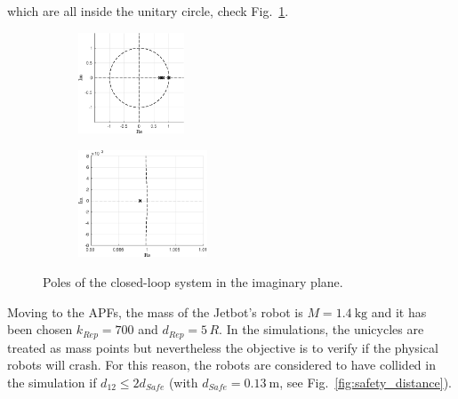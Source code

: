 \documentclass{ifacconf}
\begin{document}
which are all inside the unitary circle,
check Fig.~\ref{fig:poles-simulation}.
\begin{figure}
    \centering
    \hspace{-1.5cm}
    \begin{subfigure}[b]{0.3\columnwidth}
        \includegraphics[height=3cm]{images/simulations/poles_simulations.eps}
    \end{subfigure}
    \hspace{0.3cm}
    \begin{subfigure}[b]{0.3\columnwidth}
        \includegraphics[height=3.2cm]{images/simulations/poles_simulations_zoom.eps}
    \end{subfigure}
    \vspace{-0.3cm}
    \caption{Poles of the closed-loop system in the imaginary plane.}
    \label{fig:poles-simulation}
\end{figure}
Moving to the APFs, the mass of the Jetbot's robot is 
$M = \SI{1.4}{\kilo\gram}$ and it has been chosen $k_{Rep} = 700$
and $d_{Rep} = 5 \, R$.
In the simulations, the unicycles are treated as mass points but
nevertheless the objective is to verify if the physical robots will crash.
For this reason, the robots are considered to have collided in the simulation
if $d_{12} \leq 2 d_{Safe}$ (with $d_{Safe} = \SI{0.13}{\meter}$, 
see Fig.~\ref{fig:safety_distance}).
\end{document}
